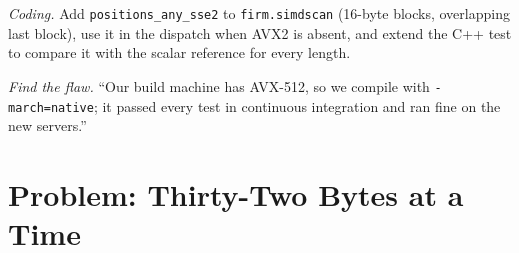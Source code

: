 \begin{exercise}[$\star\star\star$]\label{exo:ll:vector-instructions-and-data-parallel-code:7}
\emph{Coding.} Add \texttt{positions\_any\_sse2} to \texttt{firm.simdscan} (16-byte blocks, overlapping last block), use it
in the dispatch when AVX2 is absent, and extend the C++ test to compare it with the scalar reference for every length.
\end{exercise}

\begin{exercise}[$\star\star\star$]\label{exo:ll:vector-instructions-and-data-parallel-code:8}
\emph{Find the flaw.} ``Our build machine has AVX-512, so we compile with \texttt{-march=native}; it passed every test in
continuous integration and ran fine on the new servers.''
\end{exercise}

\section{Problem: Thirty-Two Bytes at a Time}


